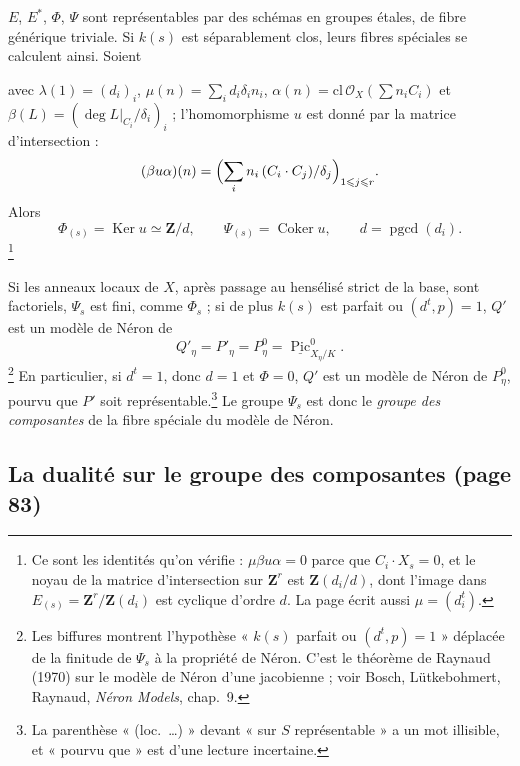 \documentclass[11pt,a4paper]{article}
\begin{document}
$E$, $E^*$, $\Phi$, $\Psi$ sont représentables par des schémas en groupes étales,
de fibre générique triviale. Si $k(s)$ est séparablement clos, leurs fibres
spéciales se calculent ainsi. Soient


avec $\lambda(1) = (d_i)_i$, $\mu(n) = \sum_i d_i\delta_in_i$, $\alpha(n) =
\mathrm{cl}\,\mathcal{O}_X(\sum n_iC_i)$ et $\beta(L) = (\deg L|_{C_i}/\delta_i)_i$
; l'homomorphisme $u$ est donné par la matrice d'intersection :
\[ (\beta u\alpha)(n) = \Bigl(\sum_i n_i\,(C_i \cdot C_j)/\delta_j\Bigr)_{1
\leqslant j \leqslant r} . \]
Alors
\[ \Phi_{(s)} = \operatorname{Ker} u \simeq \mathbf{Z}/d, \qquad \Psi_{(s)} =
\operatorname{Coker} u, \qquad d = \operatorname{pgcd}(d_i) . \]
\footnote{Ce sont les identités qu'on vérifie : $\mu\beta u\alpha = 0$ parce que
$C_i \cdot X_s = 0$, et le noyau de la matrice d'intersection sur $\mathbf{Z}^r$
est $\mathbf{Z}(d_i/d)$, dont l'image dans $E_{(s)} = \mathbf{Z}^r/\mathbf{Z}(d_i)$
est cyclique d'ordre $d$. La page écrit aussi $\mu = (d^t_i)$.}

Si les anneaux locaux de $X$, après passage au hensélisé strict de la base, sont
factoriels, $\Psi_s$ est fini, comme $\Phi_s$ ; si de plus $k(s)$ est parfait ou
$(d^t, p) = 1$, $Q'$ est un modèle de Néron de
\[ Q'_\eta = P'_\eta = P^0_\eta = \underline{\operatorname{Pic}}^0_{X_\eta/K} .
\]
\footnote{Les biffures montrent l'hypothèse « $k(s)$ parfait ou $(d^t, p) = 1$ »
déplacée de la finitude de $\Psi_s$ à la propriété de Néron. C'est le théorème de
Raynaud (1970) sur le modèle de Néron d'une jacobienne ; voir Bosch,
Lütkebohmert, Raynaud, \emph{Néron Models}, chap.~9.} En particulier, si $d^t =
1$, donc $d = 1$ et $\Phi = 0$, $Q'$ est un modèle de Néron de $P^0_\eta$, pourvu
que $P'$ soit représentable.\footnote{La parenthèse « (loc.\ \ldots) » devant
« sur $S$ représentable » a un mot illisible, et « pourvu que » est d'une lecture
incertaine.} Le groupe $\Psi_s$ est donc le \emph{groupe des composantes} de la
fibre spéciale du modèle de Néron.

\subsection*{La dualité sur le groupe des composantes (page 83)}
\end{document}
